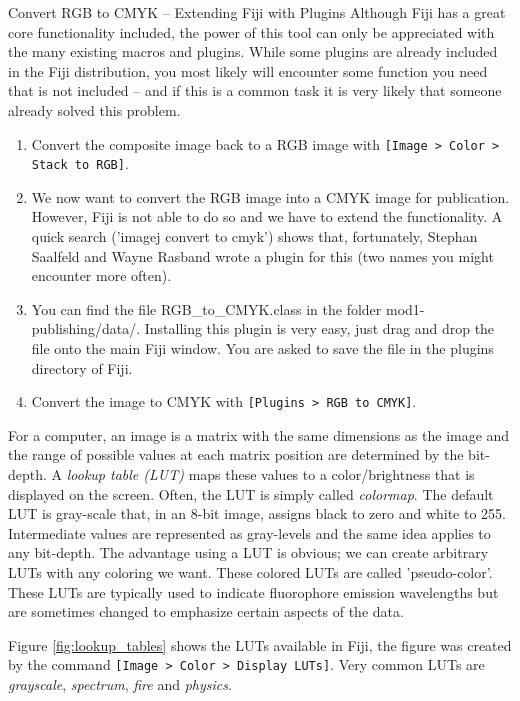 \begin{taskbox}{Convert RGB to CMYK -- Extending Fiji with Plugins}
Although Fiji has a great core functionality included, the power of this tool can only be appreciated with the many existing macros and plugins. While some plugins are already included in the Fiji distribution, you most likely will encounter some function you need that is not included -- and if this is a common task it is very likely that someone already solved this problem. 

\begin{enumerate}
	\item Convert the composite image back to a RGB image with \texttt{[Image > Color > Stack to RGB]}.
	\item We now want to convert the RGB image into a CMYK image for publication. However, Fiji is not able to do so and we have to extend the functionality. A quick search ('imagej convert to cmyk') shows that, fortunately, Stephan Saalfeld and Wayne Rasband wrote a plugin for this (two names you might encounter more often).
	\item You can find the file RGB\_to\_CMYK.class in the folder mod1-publishing/data/. Installing this plugin is very easy, just drag and drop the file onto the main Fiji window. You are asked to save the file in the plugins directory of Fiji. 
	\item Convert the image to CMYK with \texttt{[Plugins > RGB to CMYK]}.
\end{enumerate}

\end{taskbox}

For a computer, an image is a matrix with the same dimensions as the image and the range of possible values at each matrix position are determined by the bit-depth. A \emph{lookup table (LUT)} maps these values to a color/brightness that is displayed on the screen. Often, the LUT is simply called \emph{colormap}. The default LUT is gray-scale that, in an 8-bit image, assigns black to zero and white to 255. Intermediate values are represented as gray-levels and the same idea applies to any bit-depth.
The advantage using a LUT is obvious; we can create arbitrary LUTs with any coloring we want. These colored LUTs are called 'pseudo-color'. These LUTs are typically used to indicate fluorophore emission wavelengths but are sometimes changed to emphasize certain aspects of the data.

Figure \ref{fig:lookup_tables} shows the LUTs available in Fiji, the figure was created by the command \texttt{[Image > Color > Display LUTs]}. Very common LUTs are \emph{grayscale}, \emph{spectrum}, \emph{fire} and \emph{physics}.